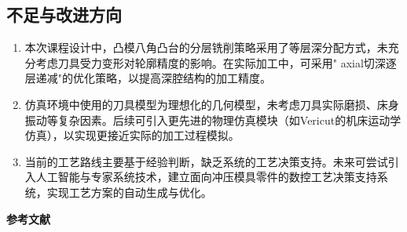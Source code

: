 \documentclass{xautCADreport}
\begin{document}
\subsection{不足与改进方向}

\begin{enumerate}
  \item 本次课程设计中，凸模八角凸台的分层铣削策略采用了等层深分配方式，未充分考虑刀具受力变形对轮廓精度的影响。在实际加工中，可采用" axial切深逐层递减"的优化策略，以提高深腔结构的加工精度。
  \item 仿真环境中使用的刀具模型为理想化的几何模型，未考虑刀具实际磨损、床身振动等复杂因素。后续可引入更先进的物理仿真模块（如Vericut的机床运动学仿真），以实现更接近实际的加工过程模拟。
  \item 当前的工艺路线主要基于经验判断，缺乏系统的工艺决策支持。未来可尝试引入人工智能与专家系统技术，建立面向冲压模具零件的数控工艺决策支持系统，实现工艺方案的自动生成与优化。
\end{enumerate}


\newpage
{}
\renewcommand{\refname}{}
\begin{center}
{\Large\bfseries 参考文献}
\end{center}
\vspace{1em}
\end{document}
